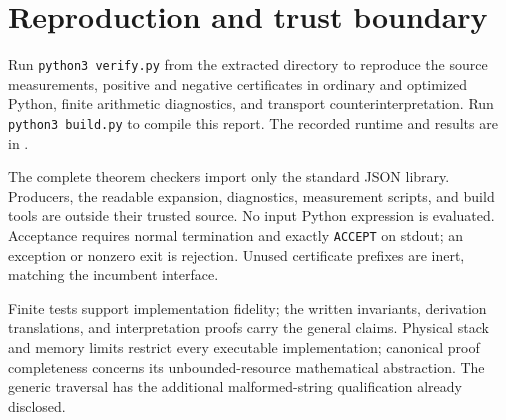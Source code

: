 \section{Reproduction and trust boundary}
Run \texttt{python3 verify.py} from the extracted directory to reproduce
the source measurements, positive and negative certificates in ordinary
and optimized Python, finite arithmetic diagnostics, and transport
counterinterpretation. Run \texttt{python3 build.py} to compile this
report. The recorded runtime and results are in
.

The complete theorem checkers import only the standard JSON library.
Producers, the readable expansion, diagnostics, measurement scripts, and
build tools are outside their trusted source. No input Python expression
is evaluated. Acceptance requires normal termination and exactly
\texttt{ACCEPT} on stdout; an exception or nonzero exit is rejection.
Unused certificate prefixes are inert, matching the incumbent interface.

Finite tests support implementation fidelity; the written invariants,
derivation translations, and interpretation proofs carry the general
claims. Physical stack and memory limits restrict every executable
implementation; canonical proof completeness concerns its
unbounded-resource mathematical abstraction. The generic traversal has
the additional malformed-string qualification already disclosed.
